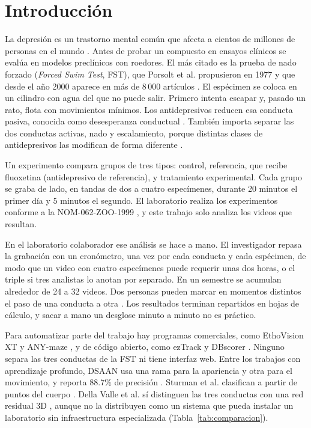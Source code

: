 \documentclass[conference,letterpaper]{IEEEtran}
\begin{document}
\section{Introducción}

La depresión es un trastorno mental común que afecta a cientos de millones de personas en el
mundo \cite{who}. Antes de probar un compuesto en ensayos clínicos se evalúa en modelos
preclínicos con roedores. El más citado es la prueba de nado forzado (\textit{Forced Swim
Test}, FST), que Porsolt et al. propusieron en 1977 \cite{porsolt} y que desde el año 2000
aparece en más de 8\,000 artículos \cite{dellavalle}. El espécimen se coloca en un cilindro
con agua del que no puede salir. Primero intenta escapar y, pasado un rato, flota con
movimientos mínimos. Los antidepresivos reducen esa conducta pasiva, conocida como
desesperanza conductual \cite{armario,slattery}. También importa separar las dos conductas
activas, nado y escalamiento, porque distintas clases de antidepresivos las modifican de
forma diferente \cite{detke}.

Un experimento compara grupos de tres tipos: control, referencia, que recibe fluoxetina
(antidepresivo de referencia), y tratamiento experimental. Cada grupo se graba de lado, en
tandas de dos a cuatro especímenes, durante 20 minutos el primer día y 5 minutos el
segundo. El laboratorio realiza los experimentos conforme a la NOM-062-ZOO-1999 \cite{nom},
y este trabajo solo analiza los videos que resultan.

En el laboratorio colaborador ese análisis se hace a mano. El investigador repasa la
grabación con un cronómetro, una vez por cada conducta y cada espécimen, de modo que un video
con cuatro especímenes puede requerir unas dos horas, o el triple si tres analistas lo
anotan por separado. En un semestre se acumulan alrededor de 24 a 32 videos. Dos personas
pueden marcar en momentos distintos el paso de una conducta a otra \cite{armario}. Los
resultados terminan repartidos en hojas de cálculo, y sacar a mano un desglose minuto
a minuto no es práctico.

Para automatizar parte del trabajo hay programas comerciales, como EthoVision XT
\cite{ethovision} y ANY-maze \cite{anymaze}, y de código abierto, como ezTrack
\cite{eztrack} y DBscorer \cite{dbscorer}. Ninguno separa las tres conductas de la FST ni
tiene interfaz web. Entre los trabajos con aprendizaje profundo, DSAAN usa una rama para la
apariencia y otra para el movimiento, y reporta 88.7\% de precisión \cite{dsaan}. Sturman
et al. clasifican a partir de puntos del cuerpo \cite{sturman}. Della Valle et al. sí
distinguen las tres conductas con una red residual 3D \cite{dellavalle}, aunque no la
distribuyen como un sistema que pueda instalar un laboratorio sin infraestructura
especializada (Tabla~\ref{tab:comparacion}).
\end{document}
